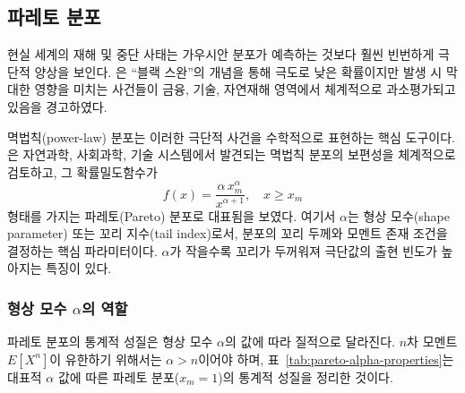 \subsection{파레토 분포}
\label{subsec:heavy-tail}

현실 세계의 재해 및 중단 사태는 가우시안 분포가 예측하는 것보다 훨씬 빈번하게
극단적 양상을 보인다. \citet{taleb2007blackswan}은 ``블랙 스완''의 개념을 통해
극도로 낮은 확률이지만 발생 시 막대한 영향을 미치는 사건들이 금융, 기술, 자연재해
영역에서 체계적으로 과소평가되고 있음을 경고하였다.

멱법칙(power-law) 분포는 이러한 극단적 사건을 수학적으로 표현하는 핵심 도구이다.
\citet{newman2005powerlaws}은 자연과학, 사회과학, 기술 시스템에서 발견되는
멱법칙 분포의 보편성을 체계적으로 검토하고, 그 확률밀도함수가 
\begin{equation}
  f(x) = \frac{\alpha \, x_m^{\alpha}}{x^{\alpha+1}}, \quad x \geq x_m
  \label{eq:pareto-pdf}
\end{equation}
형태를 가지는 파레토(Pareto) 분포로 대표됨을 보였다.
여기서 $\alpha$는 형상 모수(shape parameter) 또는 꼬리 지수(tail index)로서,
분포의 꼬리 두께와 모멘트 존재 조건을 결정하는 핵심 파라미터이다.
$\alpha$가 작을수록 꼬리가 두꺼워져 극단값의 출현 빈도가 높아지는 특징이 있다.

\subsubsection{형상 모수 $\alpha$의 역할}
\label{subsubsec:pareto-alpha}

파레토 분포의 통계적 성질은 형상 모수 $\alpha$의 값에 따라 질적으로 달라진다.
$n$차 모멘트 $E[X^n]$이 유한하기 위해서는 $\alpha > n$이어야 하며,
\p{[}표~\ref{tab:pareto-alpha-properties}\p{]}는 대표적 $\alpha$ 값에 따른
파레토 분포($x_m = 1$)의 통계적 성질을 정리한 것이다.

